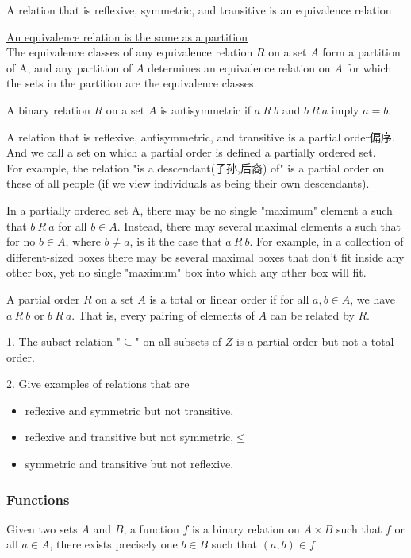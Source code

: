 \documentclass{article}
\begin{document}
A relation that is reflexive, symmetric, and transitive is an equivalence relation

\bigskip
\begin{theorem}
\underline{An equivalence relation is the same as a partition} \\
The equivalence classes of any equivalence relation $R$ on a set $A$ form a partition of A, and any partition of $A$ determines an equivalence relation on $A$ for which the sets in the partition are the equivalence classes.
\end{theorem}

\bigskip
A binary relation $R$ on a set $A$ is antisymmetric if $a\ R\ b$ and $b\ R\ a$ imply $a = b$.

A relation that is reflexive, antisymmetric, and transitive is a partial order偏序.\\
And we call a set on which a partial order is defined a partially ordered set.\\
For example, the relation "is a descendant(子孙,后裔) of" is a partial order on these of all people (if we view individuals as being their own descendants).

In a partially ordered set A, there may be no single "maximum" element a such that $b\ R\ a$ for all $b \in A$. Instead, there may several maximal elements a such that for no $b \in A$, where $b \neq a$, is it the case that $a\ R\ b$. For example, in a collection of different-sized boxes there may be several maximal boxes that don't fit inside any other box, yet no single "maximum" box into which any other box will fit.

A partial order $R$ on a set $A$ is a total or linear order if for all $a, b \in A$, we have $a\ R\ b$ or $b\ R\ a$. That is, every pairing of elements of $A$ can be related by $R$.

1. The subset relation "$\subseteq$" on all subsets of $Z$ is a partial order but not a total order.

2. Give examples of relations that are
\begin{itemize}
	\item reflexive and symmetric but not transitive,
	\item reflexive and transitive but not symmetric,$\leq$
	\item symmetric and transitive but not reflexive.
\end{itemize}

\subsubsection{Functions}
Given two sets $A$ and $B$, a function $f$ is a binary relation on $A \times B$ such that $f$ or all $a \in A$,
there exists precisely one $b \in B$ such that $(a, b) \in f$
\end{document}

